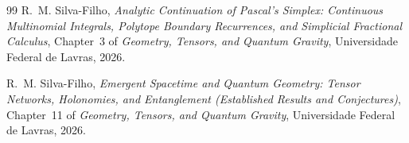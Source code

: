\documentclass[aps,prl,reprint,twocolumn,superscriptaddress,nofootinbib,floatfix]{revtex4-2}
\begin{document}
\begin{thebibliography}{99}
 R.~M. Silva-Filho, \emph{Analytic Continuation of Pascal's Simplex: Continuous Multinomial Integrals, Polytope Boundary Recurrences, and Simplicial Fractional Calculus}, Chapter~3 of \emph{Geometry, Tensors, and Quantum Gravity}, Universidade Federal de Lavras, 2026.

 R.~M. Silva-Filho, \emph{Emergent Spacetime and Quantum Geometry: Tensor Networks, Holonomies, and Entanglement (Established Results and Conjectures)}, Chapter~11 of \emph{Geometry, Tensors, and Quantum Gravity}, Universidade Federal de Lavras, 2026.

\end{thebibliography}
\end{document}
